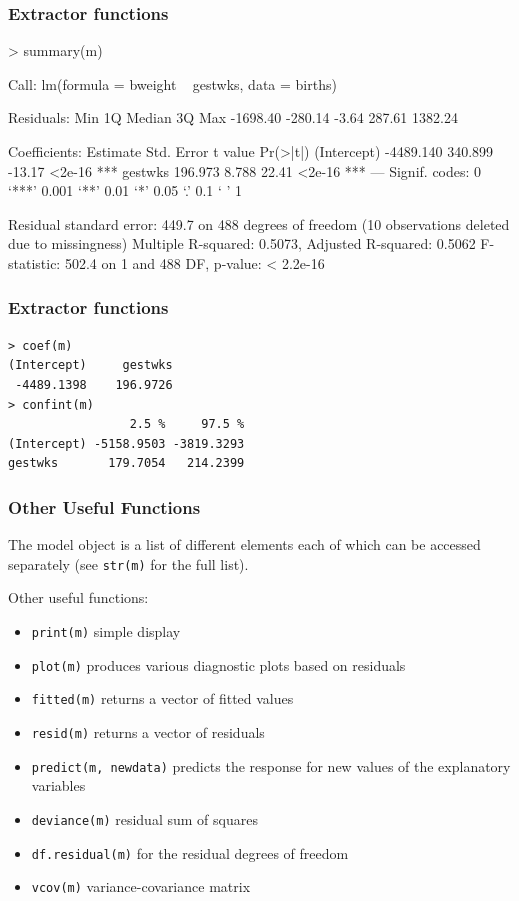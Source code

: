 \documentclass[xcolor={table}]{beamer}
\begin{document}
\begin{frame}[fragile]\frametitle{Extractor functions}\footnotesize
\begin{semiverbatim}
> summary(m)

Call:
lm(formula = bweight ~ gestwks, data = births)

Residuals:
     Min       1Q   Median       3Q      Max 
-1698.40  -280.14    -3.64   287.61  1382.24 

Coefficients:
             Estimate Std. Error t value Pr(>|t|)    
(Intercept) -4489.140    340.899  -13.17   <2e-16 ***
gestwks       196.973      8.788   22.41   <2e-16 ***
---
Signif. codes:  0 ‘***’ 0.001 ‘**’ 0.01 ‘*’ 0.05 ‘.’ 0.1 ‘ ’ 1 

Residual standard error: 449.7 on 488 degrees of freedom
  (10 observations deleted due to missingness)
Multiple R-squared: 0.5073,	Adjusted R-squared: 0.5062 
F-statistic: 502.4 on 1 and 488 DF,  p-value: < 2.2e-16 
\end{semiverbatim}
\end{frame}


\begin{frame}[fragile]\frametitle{Extractor functions}\small
\begin{verbatim}
> coef(m)
(Intercept)     gestwks 
 -4489.1398    196.9726 
> confint(m)
                 2.5 %     97.5 %
(Intercept) -5158.9503 -3819.3293
gestwks       179.7054   214.2399
\end{verbatim}
\end{frame}


\begin{frame}\frametitle{Other Useful Functions}
The model object is a list of different elements each of which can be accessed separately (see \texttt{str(m)} for the full list).

Other useful functions:
\begin{itemize}
\item \texttt{print(m)} simple display
\item \texttt{plot(m)} produces various diagnostic plots based on residuals
\item \texttt{fitted(m)} returns a vector of fitted values
\item \texttt{resid(m)} returns a vector of residuals
\item \texttt{predict(m, newdata)} predicts the response for new values of the explanatory variables
\item \texttt{deviance(m)} residual sum of squares
\item \texttt{df.residual(m)} for the residual degrees of freedom
\item \texttt{vcov(m)} variance-covariance matrix
\end{itemize}
\end{frame}
\end{document}
